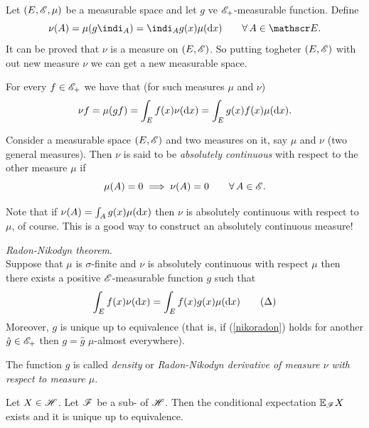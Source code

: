 \documentclass{report}
\begin{document}
\begin{revise}
	Let $(E,\mathscr{E},\mu)$ be a measurable space and let $g$ ve $\mathscr{E}_+$-measurable function. Define
	\begin{equation*}
		\nu(A)=\mu(g\indi_A)=\indi_Ag(x)\mu(\dx)\qquad\every A\in\E.
	\end{equation*}
	It can be proved that $\nu$ is a measure on $(E,\mathscr{E})$. So putting togheter $(E,\mathscr{E})$ with out new measure $\nu$ we can get a new measurable space.
	\begin{proposition}
		For every $f\in\mathscr{E}_+$ we have that (for such measures $\mu$ and $\nu$)
		\begin{equation*}
			\nu f=\mu(gf)=\int_Ef(x)\nu(\mathop{}\!\mathrm{d} x)=\int_E g(x)f(x)\mu(\mathop{}\!\mathrm{d} x).
		\end{equation*}
	\end{proposition}
	\begin{definition}
		Consider a measurable space $(E,\mathscr{E})$ and two measures on it, say $\mu$ and $\nu$ (two general measures). Then $\nu$ is said to be\emph{ absolutely continuous }with respect to the other measure $\mu$ if
		\begin{equation*}
			\mu(A)=0\implies\nu(A)=0\qquad \forall\, A\in\mathscr{E}.
		\end{equation*}
	\end{definition}
	Note that if $\nu(A)=\int_A g(x)\mu(\mathop{}\!\mathrm{d} x)$ then $\nu$ is absolutely continuous with respect to $\mu$, of course. This is a good way to construct an absolutely continuous measure!
	\begin{theorem}
		\emph{Radon-Nikodyn theorem}.\\
		Suppose that $\mu$ is $\sigma$-finite and $\nu$ is absolutely continuous with respect $\mu$ then there exists a positive $\mathscr{E}$-measurable function $g$ such that
		\begin{equation}
			\int_E f(x)\nu(\mathop{}\!\mathrm{d} x)=\int_E f(x)g(x)\mu(\mathop{}\!\mathrm{d} x)\tag{$\Delta$} \label{nikoradon}
		\end{equation}
		Moreover, $g$ is unique up to equivalence (that is, if (\ref{nikoradon}) holds for another $\hat{g}\in\mathscr{E}_+$ then $g=\hat{g}$ $\mu$-almost everywhere).
	\end{theorem}
	The function $g$ is called \emph{density} or \emph{Radon-Nikodyn derivative of measure $\nu$ with respect to measure $\mu$}.
\end{revise}
\begin{theorem}
	Let $X\in\mathscr{H}$. Let $\mathscr{F}$ be a sub-\sa{} of $\mathscr{H}$. Then the conditional expectation $\mathbb{E}_{\mathscr{F}} X$ exists and it is unique up to equivalence.
\end{theorem}
\end{document}
